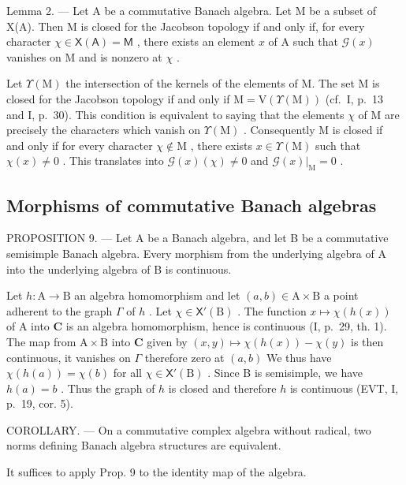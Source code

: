 Lemma 2. --- Let A be a commutative Banach algebra. Let M be a subset of X(A). Then M is closed for the Jacobson topology if and only if, for every character \(\chi \in \mathsf{X}(\mathsf{A}) = \mathsf{M}\) , there exists an element \(x\) of A such that \(\mathcal{G}(x)\) vanishes on M and is nonzero at \(\chi\) .

Let \(\Upsilon(\mathrm{M})\) the intersection of the kernels of the elements of M. The set M is closed for the Jacobson topology if and only if \(\mathrm{M} = \mathrm{V}(\Upsilon(\mathrm{M}))\) (cf.~I, p.~13 and I, p.~30). This condition is equivalent to saying that the elements \(\chi\) of M are precisely the characters which vanish on \(\Upsilon(\mathrm{M})\) . Consequently M is closed if and only if for every character \(\chi \notin \mathrm{M}\) , there exists \(x \in \Upsilon(\mathrm{M})\) such that \(\chi(x) \neq 0\) . This translates into \(\mathcal{G}(x)(\chi) \neq 0\) and \(\mathcal{G}(x)|_{\mathrm{M}} = 0\) .

\subsection{Morphisms of commutative Banach algebras}

PROPOSITION 9. --- Let A be a Banach algebra, and let B be a commutative semisimple Banach algebra. Every morphism from the underlying algebra of A into the underlying algebra of B is continuous.

Let \(h \colon \mathrm{A} \to \mathrm{B}\) an algebra homomorphism and let \((a, b) \in \mathrm{A} \times \mathrm{B}\) a point adherent to the graph \(\Gamma\) of \(h\) . Let \(\chi \in \mathsf{X}'(\mathrm{B})\) . The function \(x \mapsto \chi(h(x))\) of \(\mathrm{A}\) into \(\mathbf{C}\) is an algebra homomorphism, hence is continuous (I, p.~29, th. 1). The map from \(\mathrm{A} \times \mathrm{B}\) into \(\mathbf{C}\) given by \((x, y) \mapsto \chi(h(x)) - \chi(y)\) is then continuous, it vanishes on \(\Gamma\) therefore zero at \((a, b)\) We thus have \(\chi(h(a)) = \chi(b)\) for all \(\chi \in \mathsf{X}'(\mathrm{B})\) . Since B is semisimple, we have \(h(a) = b\) . Thus the graph of \(h\) is closed and therefore \(h\) is continuous (EVT, I, p.~19, cor. 5).

COROLLARY. --- On a commutative complex algebra without radical, two norms defining Banach algebra structures are equivalent.

It suffices to apply Prop. 9 to the identity map of the algebra.


